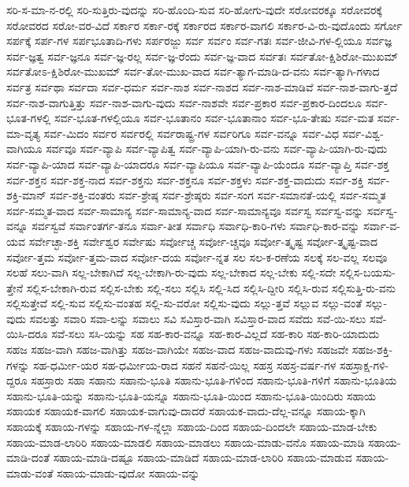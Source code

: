 {ಸರಿ-ಸ-ಮಾ-ನ-ರಲ್ಲಿ
ಸರಿ-ಸುತ್ತಿರು-ವುದನ್ನು
ಸರಿ-ಹೊಂದಿ-ಸುವ
ಸರಿ-ಹೋಗು-ವುದೇ
ಸರೋವರಕ್ಕೂ
ಸರೋವರಕ್ಕೆ
ಸರೋವರದ
ಸರೋ-ವರ-ವಿದೆ
ಸರ್ಕಾರ
ಸರ್ಕಾ-ರಕ್ಕೆ
ಸರ್ಕಾರದ
ಸರ್ಕಾರ-ವಾಗಲಿ
ಸರ್ಕಾರ-ವಿ-ರು-ವುದೊಂದು
ಸರ್ಗೋ
ಸರ್ಪಕ್ಕೆ
ಸರ್ಪ-ಗಳ
ಸರ್ಪಭೂತಾದಿ-ಗಳು
ಸರ್ಪರಜ್ಜು
ಸರ್ವ
ಸರ್ವಂ
ಸರ್ವ-ಗತಃ
ಸರ್ವ-ಜೀವಿ-ಗಳ-ಲ್ಲಿಯೂ
ಸರ್ವಜ್ಞ
ಸರ್ವ-ಜ್ಞತ್ವ
ಸರ್ವ-ಜ್ಞನೂ
ಸರ್ವ-ಜ್ಞ-ರಲ್ಲ
ಸರ್ವ-ಜ್ಞ-ರೆಂದು
ಸರ್ವ-ಜ್ಞ-ವಾದ
ಸರ್ವತಃ
ಸರ್ವತೋ-ಕ್ಷಿಶಿರೋ-ಮುಖಮ್
ಸರ್ವತೋಽ-ಕ್ಷಿಶಿರೋ-ಮುಖಮ್
ಸರ್ವ-ತೋ-ಮುಖ-ವಾದ
ಸರ್ವ-ತ್ಯಾಗ-ಮಾಡಿ-ದ-ವನು
ಸರ್ವ-ತ್ಯಾಗಿ-ಗಳಾದ
ಸರ್ವತ್ರ
ಸರ್ವಥಾ
ಸರ್ವದಾ
ಸರ್ವ-ಧರ್ಮ
ಸರ್ವ-ನಾಶ
ಸರ್ವ-ನಾಶದ
ಸರ್ವ-ನಾಶ-ಮಾಡಿವೆ
ಸರ್ವ-ನಾಶ-ವಾಗು-ತ್ತದೆ
ಸರ್ವ-ನಾಶ-ವಾಗುತ್ತಿತ್ತು
ಸರ್ವ-ನಾಶ-ವಾಗು-ವುದು
ಸರ್ವ-ನಾಶವೇ
ಸರ್ವ-ಪ್ರಕಾರ
ಸರ್ವ-ಪ್ರಕಾರ-ದಿಂದಲೂ
ಸರ್ವ-ಭೂತ-ಗಳಲ್ಲಿ
ಸರ್ವ-ಭೂತ-ಗಳಲ್ಲಿಯೂ
ಸರ್ವ-ಭೂತಾನಂ
ಸರ್ವ-ಭೂತಾನಾಂ
ಸರ್ವ-ಭೂ-ತೇಷು
ಸರ್ವ-ಮತ
ಸರ್ವ-ಮಾ-ವೃತ್ಯ
ಸರ್ವ-ಮಿದಂ
ಸರ್ವರ
ಸರ್ವರಲ್ಲಿ
ಸರ್ವರಾಷ್ಟ್ರ-ಗಳ
ಸರ್ವರಿಗೂ
ಸರ್ವ-ವನ್ನೂ
ಸರ್ವ-ವಿಧ
ಸರ್ವ-ವಿಶ್ವ-ವಾಗಿಯೂ
ಸರ್ವವೂ
ಸರ್ವ-ವ್ಯಾಪಿ
ಸರ್ವ-ವ್ಯಾಪಿತ್ವ
ಸರ್ವ-ವ್ಯಾಪಿ-ಯಾಗಿ-ರು-ವನು
ಸರ್ವ-ವ್ಯಾಪಿ-ಯಾಗಿ-ರು-ವುದು
ಸರ್ವ-ವ್ಯಾಪಿ-ಯಾದ
ಸರ್ವ-ವ್ಯಾಪಿ-ಯಾದರೂ
ಸರ್ವ-ವ್ಯಾಪಿಯೂ
ಸರ್ವ-ವ್ಯಾಪಿ-ಯೆಂದೂ
ಸರ್ವ-ವ್ಯಾಪ್ತಿ
ಸರ್ವ-ಶಕ್ತ
ಸರ್ವ-ಶಕ್ತನ
ಸರ್ವ-ಶಕ್ತ-ನಾದ
ಸರ್ವ-ಶಕ್ತನು
ಸರ್ವ-ಶಕ್ತನೂ
ಸರ್ವ-ಶಕ್ತಳು
ಸರ್ವ-ಶಕ್ತ-ವಾದುದು
ಸರ್ವ-ಶಕ್ತಿ
ಸರ್ವ-ಶಕ್ತಿ-ಮಾನ್
ಸರ್ವ-ಶಕ್ತಿ-ವಂತರು
ಸರ್ವ-ಶ್ರೇಷ್ಠ
ಸರ್ವ-ಶ್ರೇಷ್ಠರು
ಸರ್ವ-ಸಂಗ
ಸರ್ವ-ಸಮಾನತೆ-ಯಲ್ಲಿ
ಸರ್ವ-ಸಮ್ಮತ
ಸರ್ವ-ಸಮ್ಮತ-ವಾದ
ಸರ್ವ-ಸಾಮಾನ್ಯ
ಸರ್ವ-ಸಾಮಾನ್ಯ-ವಾದ
ಸರ್ವ-ಸಾಮಾನ್ಯವೂ
ಸರ್ವಸ್ವ
ಸರ್ವಸ್ವ-ವನ್ನು
ಸರ್ವಸ್ವ-ವನ್ನೂ
ಸರ್ವಸ್ವವೆ
ಸರ್ವಾಂತರ್ಗ-ತನೂ
ಸರ್ವಾ-ತೀತ
ಸರ್ವಾಧಿ
ಸರ್ವಾಧಿ-ಕಾರಿ-ಗಳು
ಸರ್ವಾಧಿ-ಕಾರ-ವನ್ನು
ಸರ್ವಾ-ವ-ಯವ
ಸರ್ವೇಚ್ಛಾ-ಶಕ್ತಿ
ಸರ್ವೇಶ್ವರ
ಸರ್ವೇಷು
ಸರ್ವೋಚ್ಚ
ಸರ್ವೋ-ಚ್ಚವೂ
ಸರ್ವೋ-ತ್ಕೃಷ್ಟ
ಸರ್ವೋ-ತ್ಕೃಷ್ಟ-ವಾದ
ಸರ್ವೋ-ತ್ತಮ
ಸರ್ವೋ-ತ್ತಮ-ವಾದ
ಸರ್ವೋ-ದಯ
ಸರ್ವೋ-ನ್ನತ
ಸಲ
ಸಲ-ಕ-ರಣೆಯ
ಸಲಕ್ಕೆ
ಸಲ-ವಲ್ಲ
ಸಲವೂ
ಸಲಹೆ
ಸಲು-ವಾಗಿ
ಸಲ್ಲ-ಬೇಕಾಗಿದೆ
ಸಲ್ಲ-ಬೇಕಾಗಿ-ರು-ವುದು
ಸಲ್ಲ-ಬೇಕಾದ
ಸಲ್ಲ-ಬೇಕು
ಸಲ್ಲಿ-ಸದೇ
ಸಲ್ಲಿಸ-ಬಯಸು-ತ್ತೇನೆ
ಸಲ್ಲಿಸ-ಬೇಕಾಗಿ-ರುವ
ಸಲ್ಲಿಸ-ಬೇಕು
ಸಲ್ಲಿ-ಸಲು
ಸಲ್ಲಿಸಿ
ಸಲ್ಲಿ-ಸಿದ
ಸಲ್ಲಿಸಿ-ದ್ದೀರಿ
ಸಲ್ಲಿಸಿ-ರುವ
ಸಲ್ಲಿಸುತ್ತಿ-ರು-ವನು
ಸಲ್ಲಿಸುತ್ತೇವೆ
ಸಲ್ಲಿ-ಸುವ
ಸಲ್ಲಿಸು-ವಂತಹ
ಸಲ್ಲಿ-ಸು-ವರೋ
ಸಲ್ಲಿಸು-ವುದು
ಸಲ್ಲು-ತ್ತವೆ
ಸಲ್ಲುವ
ಸಲ್ಲು-ವಂತೆ
ಸಲ್ಲು-ವುದು
ಸವಲತ್ತು
ಸವಾರಿ
ಸವಾ-ಲನ್ನು
ಸವಾಲು
ಸವಿ
ಸವಿಸ್ತಾರ-ವಾಗಿ
ಸವಿಸ್ತಾರ-ವಾದ
ಸವೆದು
ಸವೆ-ಯಿ-ಸಲು
ಸವೆ-ಯಿಸಿ-ದರೂ
ಸವೆ-ಸಲು
ಸಸಿ-ಯನ್ನು
ಸಹ
ಸಹ-ಕಾರ-ವನ್ನೂ
ಸಹ-ಕಾರ-ವಿಲ್ಲದೆ
ಸಹ-ಕಾರಿ
ಸಹ-ಕಾರಿ-ಯಾದುದು
ಸಹಜ
ಸಹಜ-ವಾಗಿ
ಸಹಜ-ವಾಗಿತ್ತು
ಸಹಜ-ವಾಗಿಯೇ
ಸಹಜ-ವಾದ
ಸಹಜ-ವಾದುವು-ಗಳು
ಸಹಜವೇ
ಸಹಜ-ಶಕ್ತಿ-ಗಳನ್ನು
ಸಹ-ಧರ್ಮೀ-ಯರ
ಸಹ-ಧರ್ಮೀಯ-ರಾದ
ಸಹನೆ
ಸಹನೆ-ಯಿಲ್ಲ
ಸಹಸ್ರ
ಸಹಸ್ರ-ವರ್ಷ-ಗಳ
ಸಹಸ್ರಾಕ್ಷ-ಗಳಿ-ದ್ದರೂ
ಸಹಸ್ರಾರು
ಸಹಾ
ಸಹಾನು
ಸಹಾನು-ಭೂತಿ
ಸಹಾನು-ಭೂತಿ-ಗಳಿಂದ
ಸಹಾನು-ಭೂತಿ-ಗಳಿಗೆ
ಸಹಾನು-ಭೂತಿಯ
ಸಹಾನು-ಭೂತಿ-ಯನ್ನು
ಸಹಾನು-ಭೂತಿ-ಯನ್ನೂ
ಸಹಾನು-ಭೂತಿ-ಯಿಂದ
ಸಹಾನು-ಭೂತಿ-ಯಿಂದಿರು
ಸಹಾಯ
ಸಹಾಯಕ
ಸಹಾಯಕ-ವಾಗಲಿ
ಸಹಾಯಕ-ವಾಗುವು-ದಾದರೆ
ಸಹಾಯಕ-ವಾದು-ದೆಲ್ಲ-ವನ್ನೂ
ಸಹಾಯ-ಕ್ಕಾಗಿ
ಸಹಾಯಕ್ಕೆ
ಸಹಾಯ-ಗಳನ್ನು
ಸಹಾಯ-ಗಳ-ನ್ನೆಲ್ಲಾ
ಸಹಾಯ-ದಿಂದ
ಸಹಾಯ-ದಿಂದಲೇ
ಸಹಾಯ-ಮಾಡ-ಬೇಕು
ಸಹಾಯ-ಮಾಡ-ಲಾರಿರಿ
ಸಹಾಯ-ಮಾಡಲಿ
ಸಹಾಯ-ಮಾಡಲು
ಸಹಾಯ-ಮಾಡು-ವನೊ
ಸಹಾಯ-ಮಾಡಿ
ಸಹಾಯ-ಮಾಡಿ-ದಂತೆ
ಸಹಾಯ-ಮಾಡಿ-ದಷ್ಟೂ
ಸಹಾಯ-ಮಾಡಿದೆ
ಸಹಾಯ-ಮಾಡ-ಲಾರಿರಿ
ಸಹಾಯ-ಮಾಡುವ
ಸಹಾಯ-ಮಾಡು-ವಂತೆ
ಸಹಾಯ-ಮಾಡು-ವುದೋ
ಸಹಾಯ-ವನ್ನು
}

